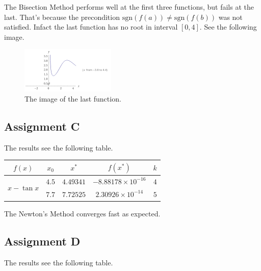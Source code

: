 \documentclass[11pt,en]{elegantpaper}
\begin{document}
The Bisection Method performs well at the first three functions, but fails at the last. That's because the precondition $\text{sgn}(f(a))\neq \text{sgn}(f(b))$ was not satisfied. Infact the last function has no root in interval $[0,4]$. See the following image.

\begin{figure}[htbp]
  \centering
  \includegraphics[width=0.4\textwidth]{image/fig1.png}
  \caption{The image of the last function.}
\end{figure}

\subsection{Assignment C}

The results see the following table.

\begin{table}[htbp]
  \centering
  \begin{tabular}{|c|c|c|c|c|}
  \hline
  \textbf{$f(x)$}             & \textbf{$x_0$} & \textbf{$x^*$} & \textbf{$f(x^*)$}         & \textbf{$k$} \\ \hline
  \multirow{2}{*}{$x-\tan x$} & $4.5$          & $4.49341$      & $-8.88178\times 10^{-16}$ & $4$          \\ \cline{2-5} 
                              & $7.7$          & $7.72525$      & $2.30926\times 10^{-14}$  & $5$          \\ \hline
  \end{tabular}
\end{table}

The Newton's Method converges fast as expected.

\subsection{Assignment D}

The results see the following table.
\end{document}
